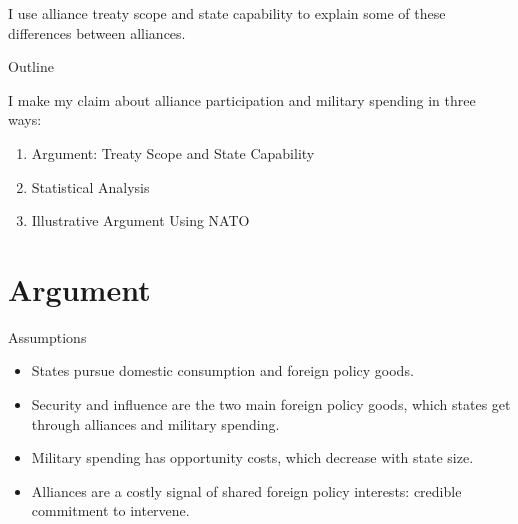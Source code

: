 \documentclass{beamer}
\begin{document}
 \begin{frame}[standout]

I use alliance treaty scope and state capability to explain some of these differences between alliances. 

 \end{frame}




\begin{frame}{Outline}

I make my claim about alliance participation and military spending in three ways: 

\pause
\begin{enumerate}
\item Argument: Treaty Scope and State Capability
\pause
\item Statistical Analysis
\pause
\item Illustrative Argument Using NATO
\end{enumerate}


\end{frame}


\section{Argument}


\begin{frame}{Assumptions}

\begin{itemize} 
\item States pursue domestic consumption and foreign policy goods. 
\pause 
\item Security and influence are the two main foreign policy goods, which states get through alliances and military spending.  
\pause 
\item Military spending has opportunity costs, which decrease with state size. 
\pause 
\item Alliances are a costly signal of shared foreign policy interests: credible commitment to intervene.  
\end{itemize}


\end{frame}

\end{document}
